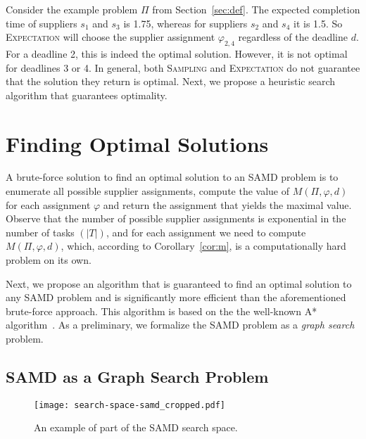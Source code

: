 \documentclass[letterpaper]{article} %
\newcommand{\samd}{\ac{SAMD}\xspace}
\newcommand{\astar}{\textsc{A*}\xspace}
\newcommand{\sampling}{\textsc{Sampling}\xspace}
\newcommand{\expectation}{\textsc{Expectation}\xspace}
\begin{document}
Consider the example problem $\Pi$ from Section~\ref{sec:def}. The expected completion time of suppliers $s_1$ and $s_3$ is 1.75, whereas for suppliers $s_2$ and $s_4$ it is 1.5. So \expectation will choose the supplier assignment $\varphi_{2,4}$ regardless of the deadline $d$. For a deadline 2, this is indeed the optimal solution. However, it is not optimal for deadlines 3 or 4. In general, both \sampling and \expectation do not guarantee that the solution they return is optimal. Next, we propose a heuristic search algorithm that guarantees optimality.











\section{Finding Optimal Solutions}\label{sec:opt}




A brute-force solution to find an optimal solution to an \samd problem is to enumerate all possible supplier assignments,
compute the value of $M(\Pi,\varphi, d)$ for each assignment $\varphi$ and return the assignment that yields the maximal value. Observe that the number of possible supplier assignments is exponential in the number of tasks $(|T|)$, and for each assignment we need to compute $M(\Pi, \varphi, d)$, which, according to Corollary~\ref{cor:m}, is a computationally hard problem on its own.





Next, we propose an algorithm that is guaranteed to find an optimal solution to any \samd problem and is significantly more efficient than the aforementioned brute-force approach. This algorithm is based on the the well-known \astar algorithm~\cite{hart1968formal}. As a preliminary, we formalize the \samd problem as a \emph{graph search} problem.


\subsection{\samd as a Graph Search Problem}
\label{sec:graph}

\begin{figure}
    \centering
    \texttt{[image: search-space-samd\_cropped.pdf]}
    \caption{An example of part of the \samd search space.}
    \label{fig:search-space}
\end{figure}
\end{document}
